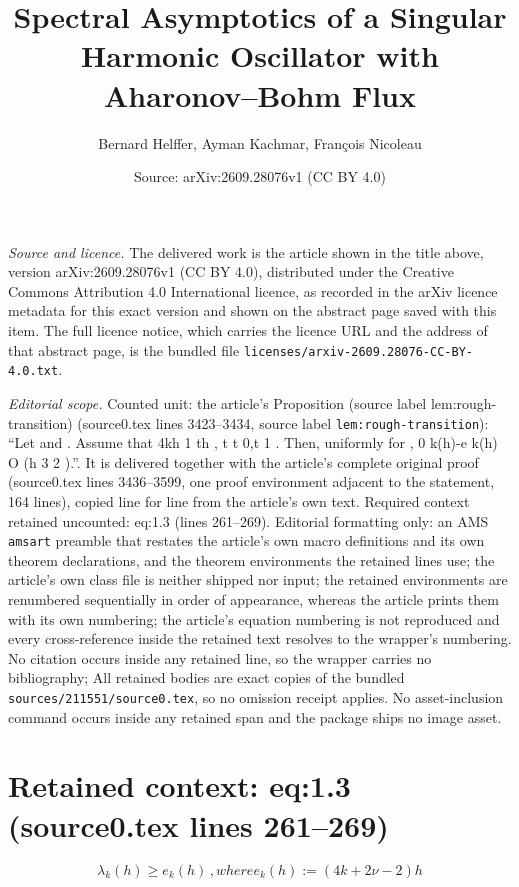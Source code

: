 \documentclass[10pt,a4paper]{amsart}
\title[Spectral Asymptotics of a Singular Harmonic Oscillator with Aharonov--Bohm Flux]{Spectral Asymptotics of a Singular Harmonic Oscillator with Aharonov--Bohm Flux}
\author{Bernard Helffer, Ayman Kachmar, Fran\c{c}ois Nicoleau}
\date{Source: arXiv:2609.28076v1 (CC BY 4.0)}
\theoremstyle{plain}
\theoremstyle{remark}
\begin{document}
\maketitle

\noindent\emph{Source and licence.} The delivered work is the article shown in the title above, version arXiv:2609.28076v1 (CC BY 4.0), distributed under the Creative Commons Attribution 4.0 International licence, as recorded in the arXiv licence metadata for this exact version and shown on the abstract page saved with this item. The full licence notice, which carries the licence URL and the address of that abstract page, is the bundled file \texttt{licenses/arxiv-2609.28076-CC-BY-4.0.txt}.
\par\smallskip

\noindent\textit{Editorial scope.} Counted unit: the article's Proposition (source label lem:rough-transition) (source0.tex lines 3423--3434, source label \texttt{lem:rough-transition}): ``Let and . Assume that 4kh 1 th , t t 0,t 1 . Then, uniformly for , 0 k(h)-e k(h) O (h 3 2 ).''. It is delivered together with the article's complete original proof (source0.tex lines 3436--3599, one proof environment adjacent to the statement, 164 lines), copied line for line from the article's own text. Required context retained uncounted: eq:1.3 (lines 261--269). Editorial formatting only: an AMS \texttt{amsart} preamble that restates the article's own macro definitions and its own theorem declarations, and the theorem environments the retained lines use; the article's own class file is neither shipped nor input; the retained environments are renumbered sequentially in order of appearance, whereas the article prints them with its own numbering; the article's equation numbering is not reproduced and every cross-reference inside the retained text resolves to the wrapper's numbering. No citation occurs inside any retained line, so the wrapper carries no bibliography; All retained bodies are exact copies of the bundled \texttt{sources/211551/source0.tex}, so no omission receipt applies. No asset-inclusion command occurs inside any retained span and the package ships no image asset.


\section*{Retained context: eq:1.3 (source0.tex lines 261--269)}

\begin{subequations}\label{eq:1.3}
\begin{equation}
\lambda_k(h)\geq e_k(h)\,,
\end{equation}
where 
\begin{equation}
e_k(h):=(4k+2\nu-2)h
\end{equation}
\end{subequations}
\end{document}
